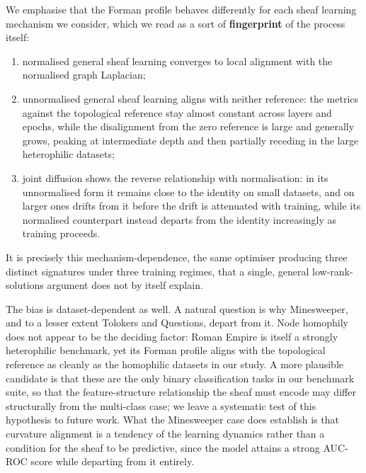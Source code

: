 We emphasise that the Forman profile behaves differently for each sheaf
learning mechanism we consider, which we read as a sort of
\textbf{fingerprint} of the process itself:
\begin{enumerate}
    \item normalised general sheaf learning converges to local alignment with
    the normalised graph Laplacian;
    \item unnormalised general sheaf learning aligns with neither reference:
    the metrics against the topological reference stay almost constant across
    layers and epochs, while the disalignment from the zero reference is large
    and generally grows, peaking at intermediate depth and then partially
    receding in the large heterophilic datasets;
    \item joint diffusion shows the reverse relationship with normalisation:
    in its unnormalised form it remains close to the identity on small
    datasets, and on larger ones drifts from it before the drift is
    attenuated with training, while its normalised counterpart instead departs
    from the identity increasingly as training proceeds.
\end{enumerate}
It is precisely this mechanism-dependence, the same optimiser producing three
distinct signatures under three training regimes, that a single, general
low-rank-solutions argument does not by itself explain.

The bias is dataset-dependent as well. A natural question is why Minesweeper,
and to a lesser extent Tolokers and Questions, depart from it. Node homophily
does not appear to be the deciding factor: Roman Empire is itself a strongly
heterophilic benchmark, yet its Forman
profile aligns with the topological reference as cleanly as the homophilic
datasets in our study. A more plausible candidate is that these are the only
binary classification tasks in our benchmark suite, so that the
feature-structure relationship the sheaf must encode may differ structurally
from the multi-class case; we leave a systematic test of this hypothesis to
future work. What the Minesweeper case does establish is that curvature
alignment is a tendency of the learning dynamics rather than a condition for
the sheaf to be predictive, since the model attains a strong AUC-ROC score
while departing from it entirely.

